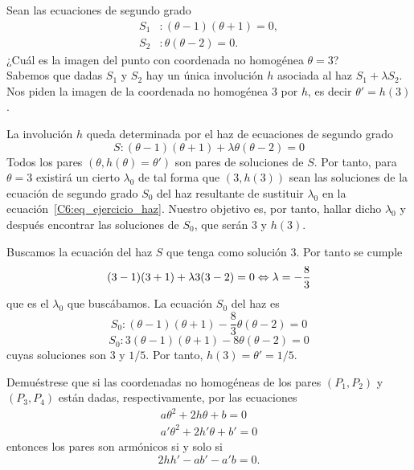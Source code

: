 \begin{exa} Sean las ecuaciones de segundo grado
	\begin{equation*}
		\begin{split}
			S_1&:(\theta-1)(\theta+1)=0,\\
			S_2&:\theta(\theta-2)=0.
		\end{split}
	\end{equation*}
	¿Cuál es la imagen del punto con coordenada no homogénea $\theta=3$?\\
	
	Sabemos que dadas $S_1$ y $S_2$ hay un única involución $h$ asociada al haz $S_1+\lambda S_2$. Nos piden la imagen de la coordenada no homogénea 3 por $h$, es decir $\theta'=h(3)$. 
	
	La involución $h$ queda determinada por el haz de ecuaciones de segundo grado
	\begin{equation}\label{C6:eq_ejercicio_haz}
		S:(\theta-1)(\theta+1)+\lambda\theta(\theta-2)=0
	\end{equation}
	Todos los pares $(\theta,h(\theta)=\theta')$ son pares de soluciones de $S$. Por tanto, para $\theta=3$ existirá un cierto $\lambda_0$ de tal forma que $(3,h(3))$ sean las soluciones de la ecuación de segundo grado $S_0$ del haz resultante de sustituir $\lambda_0$ en la ecuación~\eqref{C6:eq_ejercicio_haz}. Nuestro objetivo es, por tanto, hallar dicho $\lambda_0$ y después encontrar las soluciones de $S_0$, que serán $3$ y $h(3)$.
	
	Buscamos la ecuación del haz $S$ que tenga como solución $3$. Por tanto se cumple
	\begin{equation*}
		(3-1)(3+1)+\lambda 3(3-2)=0\Leftrightarrow \lambda=-\frac{8}{3}
	\end{equation*}
	que es el $\lambda_0$ que buscábamos. La ecuación $S_0$ del haz es
	\begin{equation*}
		S_0:(\theta-1)(\theta+1)-\frac{8}{3}\theta(\theta-2)=0
	\end{equation*}
	\begin{equation*}
		S_0:3(\theta-1)(\theta+1)-8\theta(\theta-2)=0
	\end{equation*}
	cuyas soluciones son $3$ y $1/5$. Por tanto, $h(3)=\theta'=1/5$.
\end{exa}
\begin{exerc}[Ejercicio 38]\label{C6:exerc_38}
	Demuéstrese que si las coordenadas no homogéneas de los pares $(P_1,P_2)$ y $(P_3,P_4)$ están dadas, respectivamente, por las ecuaciones 
	\begin{equation*}
		\begin{split}
			a\theta^2+2h\theta+b=0\\
			a'\theta^2+2h'\theta+b'=0
		\end{split}
	\end{equation*}
	entonces los pares son armónicos si y solo si
	\begin{equation*}
		2hh'-ab'-a'b=0.
	\end{equation*}
\end{exerc}
